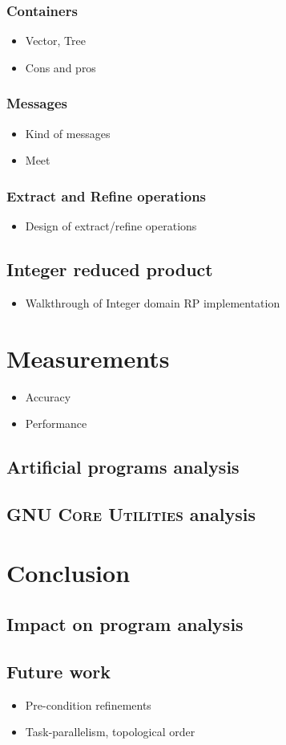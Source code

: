 \documentclass[12pt,oneside]{fithesis2}
\theoremstyle{definition}
\begin{document}
\subsection{Containers}
\begin{itemize}
  \item Vector, Tree
  \item Cons and pros
\end{itemize}

\subsection{Messages}
\begin{itemize}
  \item Kind of messages
  \item Meet
\end{itemize}

\subsection{Extract and Refine operations}
\begin{itemize}
  \item Design of extract/refine operations
\end{itemize}

\section{Integer reduced product}
\begin{itemize}
  \item Walkthrough of Integer domain RP implementation
\end{itemize}


\chapter{Measurements}
\begin{itemize}
  \item Accuracy
  \item Performance
\end{itemize}
\section{Artificial programs analysis}
\section{\textsc{GNU Core Utilities} analysis}


\chapter{Conclusion}
\section{Impact on program analysis}
\section{Future work}
\begin{itemize}
  \item Pre-condition refinements
  \item Task-parallelism, topological order
\end{itemize}



\end{document}
